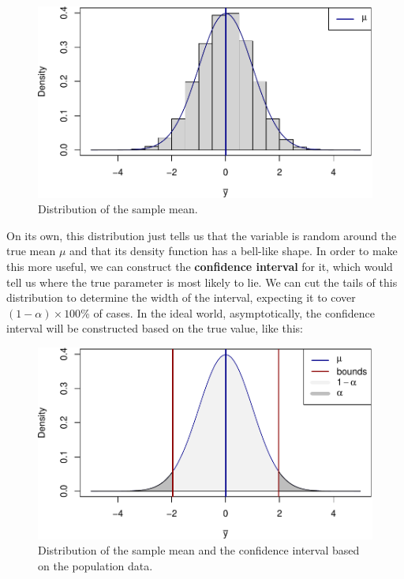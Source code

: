 \documentclass[
]{book}
\theoremstyle{definition}
\theoremstyle{definition}
\theoremstyle{definition}
\theoremstyle{definition}
\theoremstyle{remark}
\begin{document}
\begin{figure}
\centering
\includegraphics{Svetunkov---Statistics-for-Business-Analytics_files/figure-latex/normalCurveBasic-1.pdf}
\caption{\label{fig:normalCurveBasic}Distribution of the sample mean.}
\end{figure}

On its own, this distribution just tells us that the variable is random around the true mean \(\mu\) and that its density function has a bell-like shape. In order to make this more useful, we can construct the \textbf{confidence interval} for it, which would tell us where the true parameter is most likely to lie. We can cut the tails of this distribution to determine the width of the interval, expecting it to cover \((1-\alpha)\times 100\)\% of cases. In the ideal world, asymptotically, the confidence interval will be constructed based on the true value, like this:

\begin{figure}
\centering
\includegraphics{Svetunkov---Statistics-for-Business-Analytics_files/figure-latex/normalCurveIntervals-1.pdf}
\caption{\label{fig:normalCurveIntervals}Distribution of the sample mean and the confidence interval based on the population data.}
\end{figure}
\end{document}
